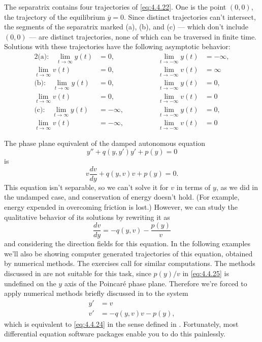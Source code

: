 \begin{example}
The separatrix contains four trajectories of \eqref{eq:4.4.22}. One is the
point $(0,0)$, the trajectory of the equilibrium $\overline y=0$.
Since distinct trajectories can't intersect, the segments of the
separatrix marked (a), (b), and (c) --- which don't include $(0,0)$ ---
are distinct trajectories, none of which can be traversed in finite
time. Solutions with these trajectories have the following asymptotic
behavior:
\begin{alignat*}{2}
\text{(a):}\quad
\lim_{t\to\infty}y(t)&=0, &\lim_{t\to-\infty}y(t)&=-\infty,\\
\lim_{t\to\infty}v(t)&=0, &\lim_{t\to-\infty}v(t)&=\infty \\
\text{(b):}\quad\lim_{t\to\infty}y(t)&=0, &\lim_{t\to-\infty}y(t)&=0,\\
\lim_{t\to\infty}v(t)&=0, &\lim_{t\to-\infty}v(t)&=0\\
\text{(c):}\quad\lim_{t\to\infty}y(t)&=-\infty, &\lim_{t\to-\infty}y(t)&=0,\\
\lim_{t\to\infty}v(t)&=-\infty, \qquad\qquad&\lim_{t\to-\infty}v(t)&=0
\end{alignat*}
\end{example}



The phase plane equivalent of the damped autonomous equation
\begin{equation} \label{eq:4.4.24}
y''+q(y,y')y'+p(y)=0
\end{equation}
is
\[
v\frac{dv}{dy}+q(y,v)v+p(y)=0.
\]
This equation isn't  separable, so we can't solve it for $v$ in terms
of
$y$,
as we did in the undamped case, and conservation of energy doesn't
hold. (For example, energy expended in overcoming friction is lost.)
However, we can study the qualitative behavior of its solutions by
rewriting it as
\begin{equation} \label{eq:4.4.25}
\frac{dv}{dy}=-q(y,v)-\frac{p(y)}{v}
\end{equation}
and considering the direction fields for this equation. In the
following examples we'll also be showing computer generated
trajectories of this equation, obtained by numerical methods. The
exercises call for similar computations. The methods discussed in
 are not suitable for this
task, since  $p(y)/v$ in \eqref{eq:4.4.25} is undefined on the $y$ axis
of the Poincaré phase plane. Therefore we're forced to apply
numerical methods briefly discussed in  to the
system
\begin{align*}
y'&=v\\
v'&=-q(y,v)v-p(y),
\end{align*}
which is equivalent to \eqref{eq:4.4.24} in the sense defined in
. Fortunately, most differential equation software
packages  enable you to do this painlessly.

